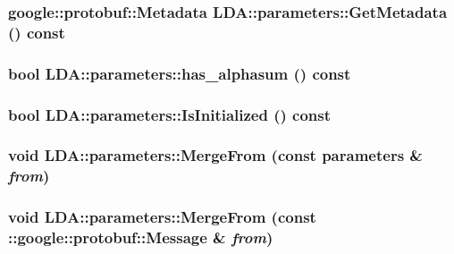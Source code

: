 \label{class_l_d_a_1_1parameters_a2e64015d79045c906f04e0030cf19215}
\hypertarget{class_l_d_a_1_1parameters_a2b1e2cddb1825734d64c66ac89512a54}{
\subsubsection[{GetMetadata}]{\setlength{\rightskip}{0pt plus 5cm}google::protobuf::Metadata LDA::parameters::GetMetadata () const}}
\label{class_l_d_a_1_1parameters_a2b1e2cddb1825734d64c66ac89512a54}
\hypertarget{class_l_d_a_1_1parameters_aed24909e1f195c18f9fe3425f09dda69}{
\subsubsection[{has\_\-alphasum}]{\setlength{\rightskip}{0pt plus 5cm}bool LDA::parameters::has\_\-alphasum () const}}
\label{class_l_d_a_1_1parameters_aed24909e1f195c18f9fe3425f09dda69}
\hypertarget{class_l_d_a_1_1parameters_ada355a874a7d9181736896ae31e61cce}{
\subsubsection[{IsInitialized}]{\setlength{\rightskip}{0pt plus 5cm}bool LDA::parameters::IsInitialized () const}}
\label{class_l_d_a_1_1parameters_ada355a874a7d9181736896ae31e61cce}
\hypertarget{class_l_d_a_1_1parameters_a781123f6e083dae2ddb63224333cea7f}{
\subsubsection[{MergeFrom}]{\setlength{\rightskip}{0pt plus 5cm}void LDA::parameters::MergeFrom (const {\bf parameters} \& {\em from})}}
\label{class_l_d_a_1_1parameters_a781123f6e083dae2ddb63224333cea7f}
\hypertarget{class_l_d_a_1_1parameters_ada86da0ba8a80442b5a71896a4897450}{
\subsubsection[{MergeFrom}]{\setlength{\rightskip}{0pt plus 5cm}void LDA::parameters::MergeFrom (const ::google::protobuf::Message \& {\em from})}}
